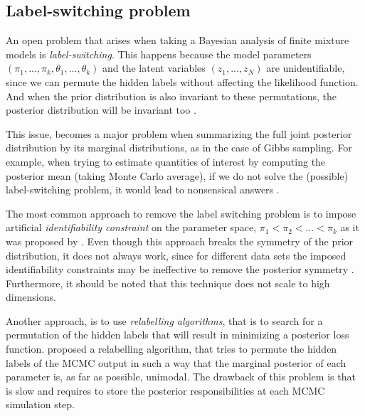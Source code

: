 \subsection{Label-switching problem} \label{fdmm-relable-subsect}
An open problem that arises when taking a Bayesian analysis of finite mixture models is \emph{label-switching}. This happens because the model parameters $(\pi_{1},...,\pi_{k},\theta_{1},...,\theta_{k})$ and the latent variables $(z_{1},...,z_{N})$ are unidentifiable, since we can permute the hidden labels without affecting the likelihood function. And when the prior distribution is also invariant to these permutations, the posterior distribution will be invariant too \citep{Rufo2006}.

This issue, becomes a major problem when summarizing the full joint posterior distribution by its marginal distributions, as in the case of Gibbs sampling. For example, when trying to estimate quantities of interest by computing the posterior mean (\ie taking Monte Carlo average), if we do not solve the (possible) label-switching problem, it would lead to nonsensical answers \citep{Stephens2000}. 

The most common approach to remove the label switching problem is to impose artificial \emph{identifiability constraint} on the parameter space, \eg $\pi_{1} < \pi_{2} < ... < \pi_{k}$ as it was proposed by \citet{Richardson1997}. Even though this approach breaks the symmetry of the prior distribution, it does not always work, since for different data sets the imposed identifiability constraints may be ineffective to remove the posterior symmetry \citep{Celeux2000}. Furthermore, it should be noted that this technique does not scale to high dimensions. 

Another approach, is to use \emph{relabelling algorithms}, that is to search for a permutation of the hidden labels that will result in minimizing a posterior loss function. \citet{Stephens2000} proposed a relabelling algorithm, that tries to permute the hidden labels of the MCMC output in such a way that the marginal posterior of each parameter is, as far as possible, unimodal. The drawback of this problem is that is slow and requires to store the posterior responsibilities at each MCMC simulation step. 